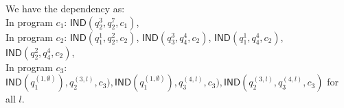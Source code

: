 \documentclass[a4paper,11pt]{article}
\begin{document}
We have the dependency as:
\\
In program $c_1$:
$\mathsf{IND}(q_2^3, q_2^7, c_1)$, 
\\
In program $c_2$:
$\mathsf{IND}(q_1^1, q_2^2, c_2)$,
$\mathsf{IND}(q_3^3, q_4^4, c_2)$,
$\mathsf{IND}(q_1^1, q_4^4, c_2)$,
$\mathsf{IND}(q_2^2, q_4^4, c_2)$,
\\
In program $c_3$: $ \mathsf{IND}(q_1^{(1,\emptyset)}), q_2^{(3, l)} , c_3 ),  
\mathsf{IND}(q_1^{(1,\emptyset)}), q_3^{(4, l)} , c_3 ), 
\mathsf{IND}(q_2^{(3, l)}, q_3^{(4, l)}, c_3)$ for all $l$.
%
\end{document}
